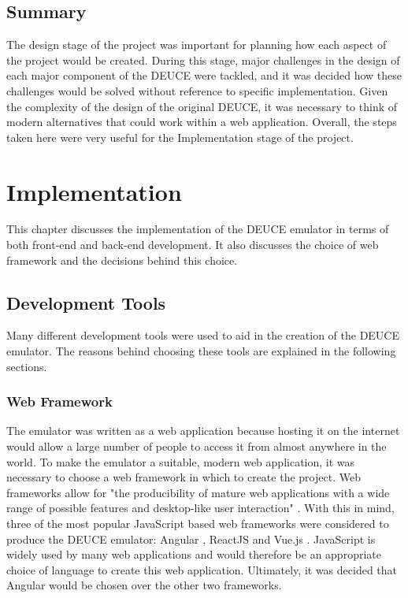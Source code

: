 \documentclass{l4proj}
\begin{document}
\section{Summary}
The design stage of the project was important for planning how each aspect of the project would be created. During this stage, major challenges in the design of each major component of the DEUCE were tackled, and it was decided how these challenges would be solved without reference to specific implementation. Given the complexity of the design of the original DEUCE, it was necessary to think of modern alternatives that could work within a web application. Overall, the steps taken here were very useful for the Implementation stage of the project.

\chapter{Implementation}
This chapter discusses the implementation of the DEUCE emulator in terms of both front-end and back-end development. It also discusses the choice of web framework and the decisions behind this choice. 

\section{Development Tools}
Many different development tools were used to aid in the creation of the DEUCE emulator. The reasons behind choosing these tools are explained in the following sections.

\subsection{Web Framework}
The emulator was written as a web application because hosting it on the internet would allow a large number of people to access it from almost anywhere in the world. To make the emulator a suitable, modern web application, it was necessary to choose a web framework in which to create the project. Web frameworks allow for "the producibility of mature web applications with a wide range of possible features and desktop-like user interaction" \citep{kersten10}. With this in mind, three of the most popular JavaScript based web frameworks were considered to produce the DEUCE emulator: Angular \citep{angular19}, ReactJS \citep{react19} and Vue.js \citep{vue19}. JavaScript is widely used by many web applications \citep{javascript15} and would therefore be an appropriate choice of language to create this web application. Ultimately, it was decided that Angular would be chosen over the other two frameworks.
\end{document}
